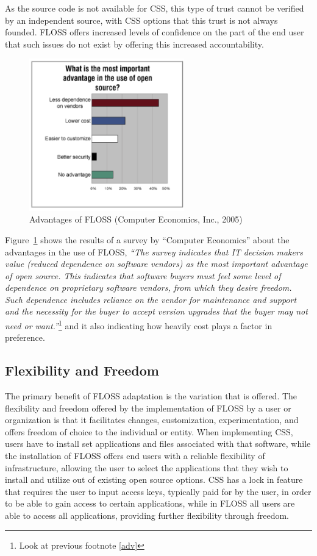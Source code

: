    As the source code is not available for CSS, this type of trust cannot be verified by an independent source, with CSS options that this trust is not always founded. FLOSS offers increased levels of confidence on the part of the end user that such issues do not exist by offering this increased accountability.
 \begin{figure}[H]
 	\centering
 	   \includegraphics[width=0.6\textwidth]{img/OSSadv.png}
 	  \caption[Advantages of FLOSS]{Advantages of FLOSS (Computer Economics, Inc., 2005)\protect \footnotemark }  
 	  \label{fig:OSSsdv}
 	 	\end{figure}
 
Figure~\ref{fig:OSSsdv} shows the results of a survey  by ``Computer Economics'' about the advantages in the use of FLOSS, \textit{``The survey indicates that IT decision makers value (reduced dependence on software vendors) as the most important advantage of open source.  This indicates that software buyers must feel some level of dependence on proprietary software vendors, from which they desire freedom.  Such dependence includes reliance on the vendor for maintenance and support and the necessity for the buyer to accept version upgrades that the buyer may not need or want.''}\footnote{Look at previous footnote \ref{adv}} and it also indicating how heavily cost plays a factor in preference.

 \subsection {Flexibility and Freedom } 
  The primary benefit of FLOSS adaptation is the variation that is offered. The flexibility and freedom offered by the implementation of FLOSS by a user or organization is that it facilitates changes, customization, experimentation, and offers freedom of choice to the individual or entity. When implementing CSS, users have to install set applications and files associated with that software, while the installation of FLOSS offers end users with a reliable flexibility of infrastructure, allowing the user to select the applications that they wish to install and utilize out of existing open source options. CSS has a lock in feature that requires the user to input access keys, typically paid for by the user, in order to be able to gain access to certain applications, while in FLOSS all users are able to access all applications, providing further flexibility through freedom. 

